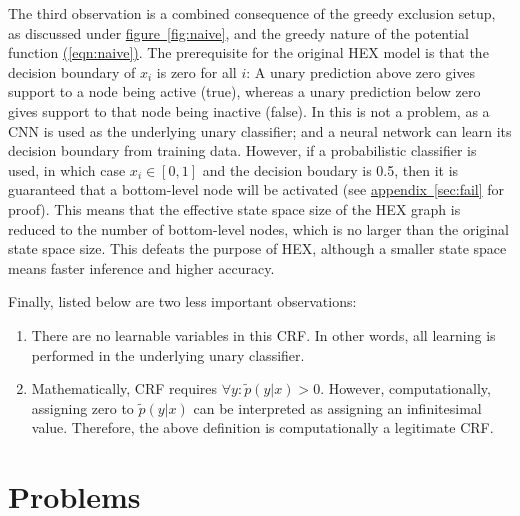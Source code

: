 \documentclass[11pt,a4paper]{book}
\begin{document}
The third observation is a combined consequence of the greedy exclusion setup, as discussed under \hyperref[fig:naive]{figure~\ref{fig:naive}}, and the greedy nature of the potential function \hyperref[eqn:naive]{(\ref{eqn:naive})}. The prerequisite for the original HEX model is that the decision boundary of $x_i$ is zero for all $i$: A unary prediction above zero gives support to a node being active (true), whereas a unary prediction below zero gives support to that node being inactive (false). In \cite{deng2014large} this is not a problem, as a CNN \cite{krizhevsky2012imagenet} is used as the underlying unary classifier; and a neural network can learn its decision boundary from training data. However, if a probabilistic classifier is used, in which case $x_i\in[0,1]$ and the decision boudary is 0.5, then it is guaranteed that a bottom-level node will be activated (see \hyperref[sec:fail]{appendix~\ref{sec:fail}} for proof). This means that the effective state space size of the HEX graph is reduced to the number of bottom-level nodes, which is no larger than the original state space size. This defeats the purpose of HEX, although a smaller state space means faster inference and higher accuracy.

Finally, listed below are two less important observations:
\begin{enumerate}
\item There are no learnable variables in this CRF. In other words, all learning is performed in the underlying unary classifier.
\item Mathematically, CRF requires $\forall y:\tilde{p}(y|x)>0$. However, computationally, assigning zero to $\tilde{p}(y|x)$ can be interpreted as assigning an infinitesimal value. Therefore, the above definition is computationally a legitimate CRF.
\end{enumerate}

\section{Problems}
\label{sec:problem}
\end{document}
